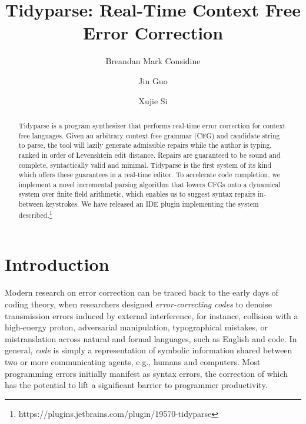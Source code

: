 \documentclass[sigplan,nonacm]{acmart}\settopmatter{printfolios=false,printccs=false,printacmref=false}
\begin{document}
\title{Tidyparse: Real-Time Context Free Error Correction}
\begin{abstract}
Tidyparse is a program synthesizer that performs real-time error correction for context free languages.
Given an arbitrary context free grammar (CFG) and candidate string to parse, the tool will lazily generate admissible repairs while the author is typing, ranked in order of Levenshtein edit distance.
 Repairs are guaranteed to be sound and complete, syntactically valid and minimal.
 Tidyparse is the first system of its kind which offers these guarantees in a real-time editor. To accelerate code completion, we implement a novel incremental parsing algorithm that lowers CFGs onto a dynamical system over finite field arithmetic, which enables us to suggest syntax repairs in-between keystrokes. We have released an IDE plugin implementing the system described.\footnote{https://plugins.jetbrains.com/plugin/19570-tidyparse}
\end{abstract}

\author{Breandan Mark Considine}

\author{Jin Guo}

\author{Xujie Si}

\maketitle

\section{Introduction}

Modern research on error correction can be traced back to the early days of coding theory, when researchers designed \textit{error-correcting codes} to denoise transmission errors induced by external interference, for instance, collision with a high-energy proton, adversarial manipulation, typographical mistakes, or mistranslation across natural and formal languages, such as English and code. In general, \textit{code} is simply a representation of symbolic information shared between two or more communicating agents, e.g., humans and computers. Most programming errors initially manifest as syntax errors, the correction of which has the potential to lift a significant barrier to programmer productivity.
\end{document}
